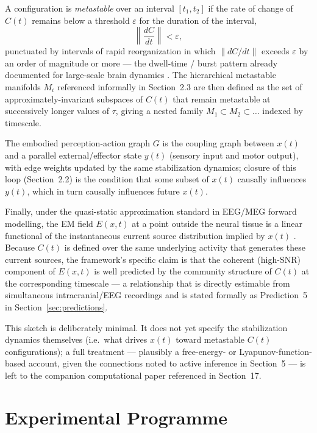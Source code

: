 \documentclass[11pt]{article}
\begin{document}
A configuration is \emph{metastable} over an interval $[t_1, t_2]$ if the rate of change of $C(t)$ remains below a threshold $\varepsilon$ for the duration of the interval,
\begin{equation}
\left\lVert \frac{dC}{dt} \right\rVert < \varepsilon ,
\end{equation}
punctuated by intervals of rapid reorganization in which $\lVert dC/dt \rVert$ exceeds $\varepsilon$ by an order of magnitude or more --- the dwell-time / burst pattern already documented for large-scale brain dynamics \citep*{rabinovich2008}. The hierarchical metastable manifolds $M_i$ referenced informally in Section~2.3 are then defined as the set of approximately-invariant subspaces of $C(t)$ that remain metastable at successively longer values of $\tau$, giving a nested family $M_1 \subset M_2 \subset \dots$ indexed by timescale.

The embodied perception-action graph $G$ is the coupling graph between $x(t)$ and a parallel external/effector state $y(t)$ (sensory input and motor output), with edge weights updated by the same stabilization dynamics; closure of this loop (Section~2.2) is the condition that some subset of $x(t)$ causally influences $y(t)$, which in turn causally influences future $x(t)$.

Finally, under the quasi-static approximation standard in EEG/MEG forward modelling, the EM field $E(x,t)$ at a point outside the neural tissue is a linear functional of the instantaneous current source distribution implied by $x(t)$ \citep*{nunez2006}. Because $C(t)$ is defined over the same underlying activity that generates these current sources, the framework's specific claim is that the coherent (high-SNR) component of $E(x,t)$ is well predicted by the community structure of $C(t)$ at the corresponding timescale --- a relationship that is directly estimable from simultaneous intracranial/EEG recordings and is stated formally as Prediction~5 in Section~\ref{sec:predictions}.

This sketch is deliberately minimal. It does not yet specify the stabilization dynamics themselves (i.e.\ what drives $x(t)$ toward metastable $C(t)$ configurations); a full treatment --- plausibly a free-energy- or Lyapunov-function-based account, given the connections noted to active inference in Section~5 --- is left to the companion computational paper referenced in Section~17.

\section{Experimental Programme}
\end{document}
